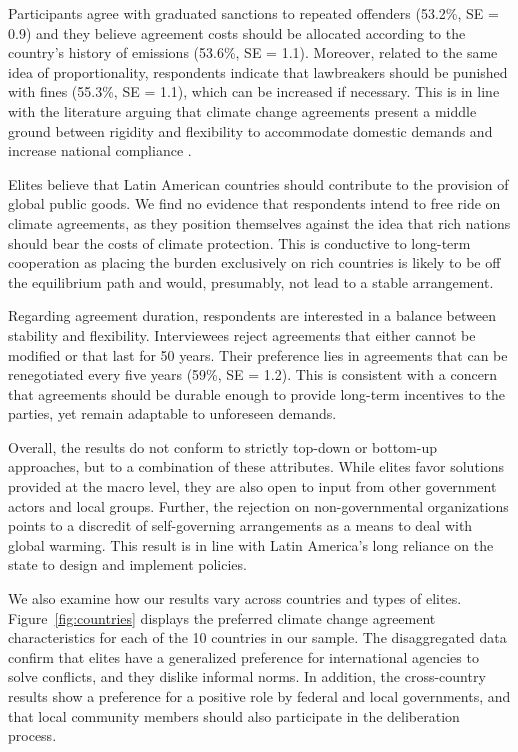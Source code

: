 \documentclass[a4paper,12pt]{article}
\begin{document}
Participants agree with graduated sanctions to repeated offenders (53.2\%, SE = 0.9) and they believe agreement costs should be allocated according to the country's history of emissions (53.6\%, SE = 1.1). Moreover, related to the same idea of proportionality, respondents indicate that lawbreakers should be punished with fines (55.3\%, SE = 1.1), which can be increased if necessary. This is in line with the literature arguing that climate change agreements present a middle ground between rigidity and flexibility to accommodate domestic demands and increase national compliance \citep{von2008international}.

Elites believe that Latin American countries should contribute to the provision of global public goods. We find no evidence that respondents intend to free ride on climate agreements, as they position themselves against the idea that rich nations should bear the costs of climate protection. This is conductive to long-term cooperation as placing the burden exclusively on rich countries is likely to be off the equilibrium path and would, presumably, not lead to a stable arrangement.

Regarding agreement duration, respondents are interested in a balance between stability and flexibility. Interviewees reject agreements that either cannot be modified or that last for 50 years. Their preference lies in agreements that can be renegotiated every five years (59\%, SE = 1.2). This is consistent with a concern that agreements should be durable enough to provide long-term incentives to the parties, yet remain adaptable to unforeseen demands.

Overall, the results do not conform to strictly top-down or bottom-up approaches, but to a combination of these attributes. While elites favor solutions provided at the macro level, they are also open to input from other government actors and local groups. Further, the rejection on non-governmental organizations points to a discredit of self-governing arrangements as a means to deal with global warming. This result is in line with Latin America's long reliance on the state to design and implement policies.

We also examine how our results vary across countries and types of elites. Figure~\ref{fig:countries} displays the preferred climate change agreement characteristics for each of the 10 countries in our sample. The disaggregated data confirm that elites have a generalized preference for international agencies to solve conflicts, and they dislike informal norms. In addition, the cross-country results show a preference for a positive role by federal and local governments, and that local community members should also participate in the deliberation process.
\end{document}

